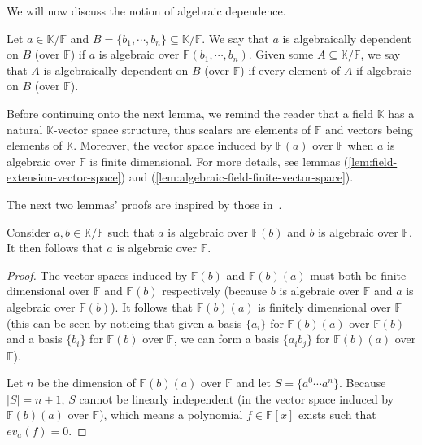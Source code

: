 We will now discuss the notion of algebraic dependence.

\begin{defn}
	Let $a \in \mathbb K / \mathbb F$ and $B = \{b _1, \cdots, b _n \} \subseteq  \mathbb K / \mathbb F$. We say that $a$ is algebraically dependent on $B$ (over $ \mathbb{F} $) if $a$ is algebraic over $\mathbb F(b _1, \cdots, b _n )$. Given some $A \subseteq  \mathbb K / \mathbb{F} $, we say that $A$ is algebraically dependent on $B$ (over $\mathbb{F} $) if every element of $A$ if algebraic on $B$ (over $\mathbb{F} $).
\end{defn}

Before continuing onto the next lemma, we remind the reader that a field $\mathbb{K}$ has a natural $\mathbb{K}$-vector space structure, thus scalars are elements of $\mathbb{F} $ and vectors being elements of $\mathbb K$. Moreover, the vector space induced by $\mathbb{F} (a)$ over $\mathbb{F} $ when $a$ is algebraic over $\mathbb{F} $ is finite dimensional. For more details, see lemmas (\ref{lem:field-extension-vector-space}) and (\ref{lem:algebraic-field-finite-vector-space}).

The next two lemmas' proofs are inspired by those in~\cite[213]{oxley1}.

\begin{lemma}\label{lem:algebraic-transitivity}
	Consider $a, b \in \mathbb K / \mathbb{F} $ such that $a$ is algebraic over $\mathbb{F}(b) $ and $b$ is algebraic over $\mathbb{F}$. It then follows that $a$ is algebraic over $\mathbb{F}$.
\end{lemma}

\begin{proof}
	The vector spaces induced by $\mathbb{F} (b)$ and $\mathbb{F} (b)(a)$ must both be finite dimensional over $\mathbb{F} $ and $\mathbb{F} (b)$ respectively (because $b$ is algebraic over $\mathbb{F} $ and $a$ is algebraic over $\mathbb{F} (b)$). It follows that $\mathbb{F} (b)(a)$ is finitely dimensional over $\mathbb{F}$ (this can be seen by noticing that given a basis $\{a _i \}$ for $\mathbb{F} (b)(a)$ over $\mathbb{F} (b)$ and a basis $\{b _i\}$ for $\mathbb{F} (b)$ over $\mathbb{F} $, we can form a basis $\{a _i b _j\}$ for $\mathbb{F} (b)(a)$ over $\mathbb{F} $).

	Let $n$ be the dimension of $\mathbb{F} (b)(a)$ over $\mathbb{F} $ and let $S = \{a ^0 \cdots a ^n \}$. Because $|S| = n + 1$, $S$ cannot be linearly independent (in the vector space induced by $\mathbb{F} (b)(a)$ over $\mathbb{F} $), which means a polynomial $f \in \mathbb{F} [x]$ exists such that $ev_a(f) = 0$.
\end{proof}

